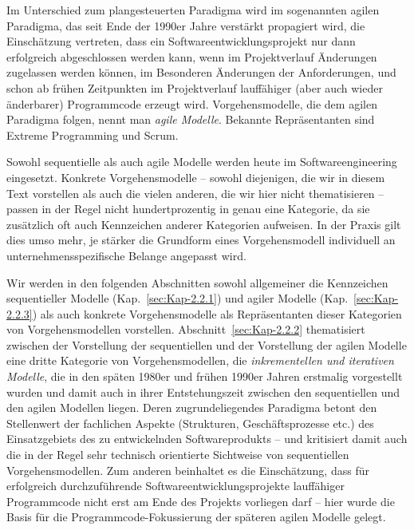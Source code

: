 Im Unterschied zum plangesteuerten Paradigma wird im sogenannten agilen Paradigma, das seit Ende der 1990er Jahre verstärkt propagiert wird, die Einschätzung vertreten, dass ein Softwareentwicklungsprojekt nur dann erfolgreich abgeschlossen werden kann, wenn im Projektverlauf Änderungen zugelassen werden können, im Besonderen Änderungen der Anforderungen, und schon ab frühen Zeitpunkten im Projektverlauf lauffähiger (aber auch wieder änderbarer) Programmcode erzeugt wird. Vorgehensmodelle, die dem agilen Paradigma folgen, nennt man 
\textit{agile Modelle}. Bekannte Repräsentanten sind Extreme Programming und Scrum.

Sowohl sequentielle als auch agile Modelle werden heute im Softwareengineering eingesetzt. Konkrete Vorgehensmodelle – sowohl diejenigen, die wir in diesem Text vorstellen als auch die vielen anderen, die wir hier nicht thematisieren – passen in der Regel nicht hundertprozentig in genau eine Kategorie, da sie zusätzlich oft auch Kennzeichen anderer Kategorien aufweisen. In der Praxis gilt dies umso mehr, je stärker die Grundform eines Vorgehensmodell individuell an unternehmensspezifische Belange angepasst wird.

Wir werden in den folgenden Abschnitten sowohl allgemeiner die Kennzeichen sequentieller Modelle (Kap.~\ref{sec:Kap-2.2.1}) und agiler Modelle (Kap.~\ref{sec:Kap-2.2.3}) als auch konkrete Vorgehensmodelle als Repräsentanten dieser Kategorien von Vorgehensmodellen vorstellen. Abschnitt~\ref{sec:Kap-2.2.2} thematisiert zwischen der Vorstellung der sequentiellen und der Vorstellung der agilen Modelle eine dritte Kategorie von Vorgehensmodellen, die \textit{inkrementellen und iterativen Modelle}, 
die in den späten 1980er und frühen 1990er Jahren erstmalig vorgestellt wurden und damit auch in ihrer Entstehungszeit zwischen den sequentiellen und den agilen Modellen liegen. Deren zugrundeliegendes Paradigma betont den Stellenwert der fachlichen Aspekte (Strukturen, Geschäftsprozesse etc.) des Einsatzgebiets des zu entwickelnden Softwareprodukts – und kritisiert damit auch die in der Regel sehr technisch orientierte Sichtweise von sequentiellen Vorgehensmodellen. Zum anderen beinhaltet es die Einschätzung, dass für erfolgreich durchzuführende Softwareentwicklungsprojekte lauffähiger Programmcode nicht erst am Ende des Projekts vorliegen darf – hier wurde die Basis für die Programmcode-Fokussierung der späteren agilen Modelle gelegt. 


